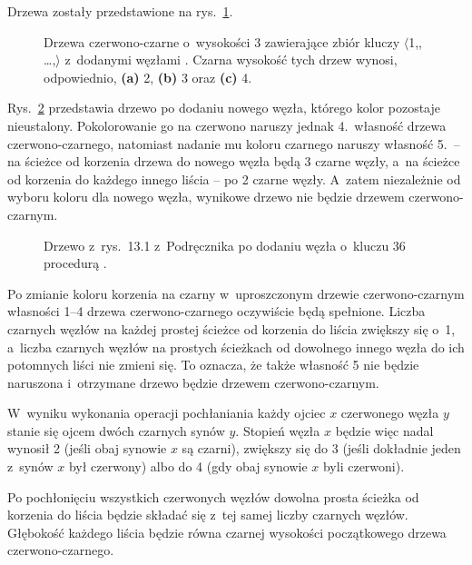 
\exercise %
Drzewa zostały przedstawione na rys.\ \ref{fig:13.1-1}.
\begin{figure}[ht]
	\centering 
	\caption{Drzewa czerwono-czarne o~wysokości 3 zawierające zbiór kluczy $\langle$1,,\! \dots,$\rangle$ z~dodanymi węzłami .
	Czarna wysokość tych drzew wynosi, odpowiednio, {\sffamily\bfseries(a)} 2, {\sffamily\bfseries(b)} 3 oraz {\sffamily\bfseries(c)} 4.} \label{fig:13.1-1}
\end{figure}

\exercise %
Rys.\ \ref{fig:13.1-2} przedstawia drzewo po dodaniu nowego węzła, którego kolor pozostaje nieustalony.
Pokolorowanie go na czerwono naruszy jednak 4.\ własność drzewa czerwono-czarnego, natomiast nadanie mu koloru czarnego naruszy własność 5.\ -- na ścieżce od korzenia drzewa do nowego węzła będą 3 czarne węzły, a~na ścieżce od korzenia do każdego innego liścia -- po 2 czarne węzły.
A~zatem niezależnie od wyboru koloru dla nowego węzła, wynikowe drzewo nie będzie drzewem czerwono-czarnym.
\begin{figure}[ht]
	\centering 
	\caption{Drzewo z~rys.\ 13.1 z~Podręcznika po dodaniu węzła o~kluczu 36 procedurą .} \label{fig:13.1-2}
\end{figure}

\exercise %
Po zmianie koloru korzenia na czarny w~uproszczonym drzewie czerwono-czarnym własności 1--4 drzewa czerwono-czarnego oczywiście będą spełnione.
Liczba czarnych węzłów na każdej prostej ścieżce od korzenia do liścia zwiększy się o~1, a~liczba czarnych węzłów na prostych ścieżkach od dowolnego innego węzła do ich potomnych liści nie zmieni się.
To oznacza, że także własność 5 nie będzie naruszona i~otrzymane drzewo będzie drzewem czerwono-czarnym.

\exercise %
W~wyniku wykonania operacji pochłaniania każdy ojciec $x$ czerwonego węzła $y$ stanie się ojcem dwóch czarnych synów $y$.
Stopień węzła $x$ będzie więc nadal wynosił 2 (jeśli obaj synowie $x$ są czarni), zwiększy się do 3 (jeśli dokładnie jeden z~synów $x$ był czerwony) albo do 4 (gdy obaj synowie $x$ byli czerwoni).

Po pochłonięciu wszystkich czerwonych węzłów dowolna prosta ścieżka od korzenia do liścia będzie składać się z~tej samej liczby czarnych węzłów.
Głębokość każdego liścia będzie równa czarnej wysokości początkowego drzewa czerwono-czarnego.

\exercise %
\exercise %
\exercise %
